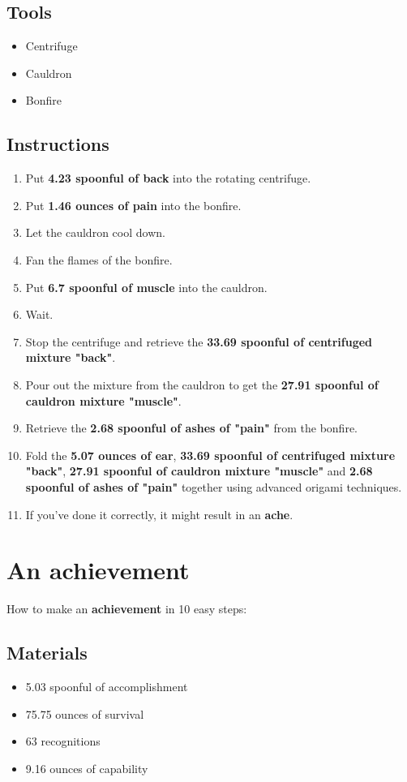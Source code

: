 \documentclass{article}
\begin{document}
\subsection{Tools}\begin{itemize}
\item 
Centrifuge
\item 
Cauldron
\item 
Bonfire
\end{itemize}
\subsection{Instructions}\begin{enumerate}
\item 
Put \textbf{4.23 spoonful of back} into the rotating centrifuge.
\item 
Put \textbf{1.46 ounces of pain} into the bonfire.
\item 
Let the cauldron cool down.
\item 
Fan the flames of the bonfire.
\item 
Put \textbf{6.7 spoonful of muscle} into the cauldron.
\item 
Wait.
\item 
Stop the centrifuge and retrieve the \textbf{33.69 spoonful of centrifuged mixture "back"}.
\item 
Pour out the mixture from the cauldron to get the \textbf{27.91 spoonful of cauldron mixture "muscle"}.
\item 
Retrieve the \textbf{2.68 spoonful of ashes of "pain"} from the bonfire.
\item 
Fold the \textbf{5.07 ounces of ear}, \textbf{33.69 spoonful of centrifuged mixture "back"}, \textbf{27.91 spoonful of cauldron mixture "muscle"} and \textbf{2.68 spoonful of ashes of "pain"} together using advanced origami techniques.
\item 
If you've done it correctly, it might result in an \textbf{ache}.
\end{enumerate}
\newpage
\section{An achievement}How to make an \textbf{achievement} in 10 easy steps:

\subsection{Materials}\begin{itemize}
\item 
5.03 spoonful of accomplishment
\item 
75.75 ounces of survival
\item 
63 recognitions
\item 
9.16 ounces of capability
\end{itemize}
\end{document}
